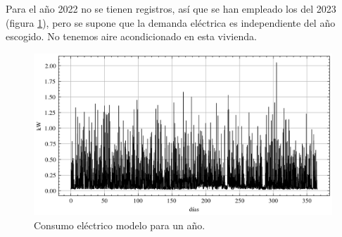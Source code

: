 Para el año 2022 no se tienen registros, así que se han empleado los del 2023
(figura \ref{fig:p_demand_year}), pero se supone que la demanda eléctrica es
independiente del año escogido. No tenemos aire acondicionado en esta vivienda.

\begin{figure}[h] \centering
	\centering
	\includegraphics[width=1\textwidth]{./capitulos/adquisicion_de_datos/images/p_demand_year.png}
	\caption{Consumo eléctrico modelo para un año.}
	\label{fig:p_demand_year}
\end{figure}
